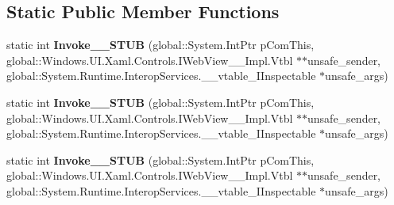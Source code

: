 \subsection*{Static Public Member Functions}
\begin{DoxyCompactItemize}
\item 
\mbox{\label{struct_windows_1_1_foundation_1_1_typed_event_handler___a___windows___u_i___xaml___controls___weea5b22fbafcb30e85441c364b622cfb7_aa173bbdb5241d3b82b7bb82392ec2530}} 
static int {\bfseries Invoke\+\_\+\+\_\+\+S\+T\+UB} (global\+::\+System.\+Int\+Ptr p\+Com\+This, global\+::\+Windows.\+U\+I.\+Xaml.\+Controls.\+I\+Web\+View\+\_\+\+\_\+\+Impl.\+Vtbl $\ast$$\ast$unsafe\+\_\+sender, global\+::\+System.\+Runtime.\+Interop\+Services.\+\_\+\+\_\+vtable\+\_\+\+I\+Inspectable $\ast$unsafe\+\_\+args)
\item 
\mbox{\label{struct_windows_1_1_foundation_1_1_typed_event_handler___a___windows___u_i___xaml___controls___weea5b22fbafcb30e85441c364b622cfb7_aa173bbdb5241d3b82b7bb82392ec2530}} 
static int {\bfseries Invoke\+\_\+\+\_\+\+S\+T\+UB} (global\+::\+System.\+Int\+Ptr p\+Com\+This, global\+::\+Windows.\+U\+I.\+Xaml.\+Controls.\+I\+Web\+View\+\_\+\+\_\+\+Impl.\+Vtbl $\ast$$\ast$unsafe\+\_\+sender, global\+::\+System.\+Runtime.\+Interop\+Services.\+\_\+\+\_\+vtable\+\_\+\+I\+Inspectable $\ast$unsafe\+\_\+args)
\item 
\mbox{\label{struct_windows_1_1_foundation_1_1_typed_event_handler___a___windows___u_i___xaml___controls___weea5b22fbafcb30e85441c364b622cfb7_aa173bbdb5241d3b82b7bb82392ec2530}} 
static int {\bfseries Invoke\+\_\+\+\_\+\+S\+T\+UB} (global\+::\+System.\+Int\+Ptr p\+Com\+This, global\+::\+Windows.\+U\+I.\+Xaml.\+Controls.\+I\+Web\+View\+\_\+\+\_\+\+Impl.\+Vtbl $\ast$$\ast$unsafe\+\_\+sender, global\+::\+System.\+Runtime.\+Interop\+Services.\+\_\+\+\_\+vtable\+\_\+\+I\+Inspectable $\ast$unsafe\+\_\+args)
\item 
\mbox{\label{struct_windows_1_1_foundation_1_1_typed_event_handler___a___windows___u_i___xaml___controls___weea5b22fbafcb30e85441c364b622cfb7_aa173bbdb5241d3b82b7bb82392ec2530}} 
$$
\end{DoxyCompactItemize}
